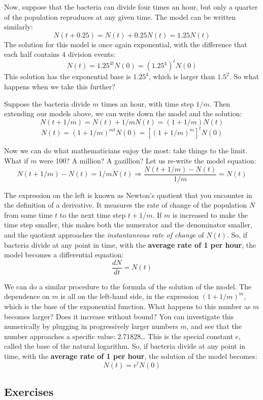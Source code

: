 \documentclass[
  letterpaper,
  DIV=11,
  numbers=noendperiod]{scrreprt}
\begin{document}
Now, suppose that the bacteria can divide four times an hour, but only a
quarter of the population reproduces at any given time. The model can be
written similarly: \[N(t+0.25) = N(t) + 0.25N(t) = 1.25N(t)\] The
solution for this model is once again exponential, with the difference
that each half contains 4 division events:
\[N(t) = 1.25^{4t}N(0) = (1.25^4)^t N(0)\] This solution has the
exponential base is \(1.25^4\), which is larger than \(1.5^2\). So what
happens when we take this further?

Suppose the bacteria divide \(m\) times an hour, with time step \(1/m\).
Then extending our models above, we can write down the model and the
solution: \[ N(t + 1/m) = N(t) + 1/m N(t) = (1+1/m) N(t) \]
\[ N(t) = (1+1/m)^{mt} N(0) = [(1+1/m)^m]^t N(0)\]

Now we can do what mathematicians enjoy the most: take things to the
limit. What if \(m\) were 100? A million? A gazillion? Let us re-write
the model equation:
\[ N(t+1/m) - N(t) = 1/m N(t) \Rightarrow \frac{N(t+1/m) - N(t) }{1/m} = N(t)\]

The expression on the left is known as Newton's quotient that you
encounter in the definition of a derivative. It measures the rate of
change of the population \(N\) from some time \(t\) to the next time
step \(t+1/m\). If \(m\) is increased to make the time step smaller,
this makes both the numerator and the denominator smaller, and the
quotient approaches the \emph{instantaneous rate of change} of \(N(t)\).
So, if bacteria divide at any point in time, with the
\textbf{average rate of 1 per hour}, the model becomes a differential
equation: \[ \frac{dN}{dt} = N(t)\]

We can do a similar procedure to the formula of the solution of the
model. The dependence on \(m\) is all on the left-hand side, in the
expression \((1+1/m)^m\), which is the base of the exponential function.
What happens to this number as \(m\) becomes larger? Does it increase
without bound? You can investigate this numerically by plugging in
progressively larger numbers \(m\), and see that the number approaches a
specific value: 2.71828\ldots{} This is the special constant \(e\),
called the base of the natural logarithm. So, if bacteria divide at any
point in time, with the \textbf{average rate of 1 per hour}, the
solution of the model becomes: \[ N(t) = e^t N(0)\]

\hypertarget{exercises-20}{%
\subsection{Exercises}\label{exercises-20}}
\end{document}
